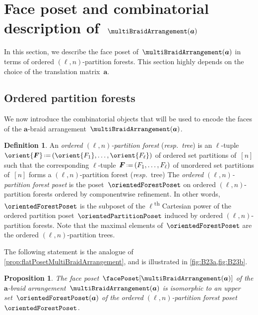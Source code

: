 \documentclass{amsart}
\newcommand{\darkblue}{\color{darkblue}} %
\newtheorem{proposition}[theorem]{Proposition}
\theoremstyle{definition}
\newtheorem{definition}[theorem]{Definition}
\renewcommand{\b}[1]{{\boldsymbol{#1}}} %
\newcommand{\eqdef}{\mbox{\,\raisebox{0.2ex}{\scriptsize\ensuremath{\mathrm:}}\ensuremath{=}\,}} %
\newcommand{\resp}{\textit{resp.}~} %
\newcommand{\ordinal}{\textsuperscript{th}} %
\newcommand{\defn}[1]{\textsl{\darkblue #1}} %
\renewcommand{\b}[1]{\boldsymbol{#1}} %
\begin{document}

\section{Face poset and combinatorial description of~$\multiBraidArrangement(\b{a})$}
\label{sec:facePoset}

In this section, we describe the face poset of~$\multiBraidArrangement(\b{a})$ in terms of ordered $(\ell,n)$-partition forests.
This section highly depends on the choice of the translation matrix~$\b{a}$.


\subsection{Ordered partition forests}
\label{subsec:orderedPartitionForests}

We now introduce the combinatorial objects that will be used to encode the faces of the $\b{a}$-braid arrangement~$\multiBraidArrangement(\b{a})$.

\begin{definition}
\label{def:orderedPartitionForest}
An \defn{ordered $(\ell,n)$-partition forest} (\resp \defn{tree}) is an $\ell$-tuple~$\orient{\b{F}} \eqdef (\orient{F_1}, \dots, \orient{F_\ell})$ of ordered set partitions of~$[n]$ such that the corresponding $\ell$-tuple~$\b{F} \eqdef (F_1, \dots, F_\ell)$ of unordered set partitions of~$[n]$ forms a $(\ell,n)$-partition forest (\resp tree)
The \defn{ordered $(\ell,n)$-partition forest poset} is the poset~$\orientedForestPoset$ on ordered $(\ell,n)$-partition forests ordered by componentwise refinement.
In other words, $\orientedForestPoset$ is the subposet of the $\ell$\ordinal{} Cartesian power of the ordered partition poset~$\orientedPartitionPoset$ induced by ordered $(\ell,n)$-partition forests.
Note that the maximal elements of~$\orientedForestPoset$ are the ordered $(\ell, n)$-partition trees.
\end{definition}

The following statement is the analogue of \cref{prop:flatPosetMultiBraidArrangement}, and is illustrated in \cref{fig:B23a,fig:B23b}.

\begin{proposition}
\label{prop:facePosetMultiBraidArrangement}
The face poset~$\facePoset[\multiBraidArrangement(\b{a})]$ of the $\b{a}$-braid arrangement~$\multiBraidArrangement(\b{a})$ is isomorphic to an upper set~$\orientedForestPoset(\b{a})$ of the ordered $(\ell,n)$-partition forest poset~$\orientedForestPoset$.
\end{proposition}
\end{document}
